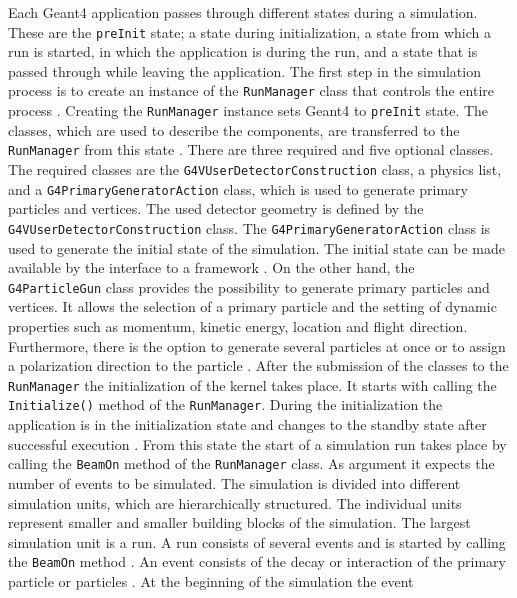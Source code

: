 \documentclass[12pt, a4paper]{thesis}
\begin{document}
Each Geant4 application passes through different states during a
simulation. These are the \texttt{preInit} state; a state during
initialization, a state from which a run is started, in which the
application is during the run, and a state that is passed through
while leaving the application. The first step in the simulation
process is to create an instance of the \texttt{RunManager} class that
controls the entire process \cite{geant4-doc} . Creating the
\texttt{RunManager} instance sets Geant4 to \texttt{preInit}
state. The classes, which are used to describe the components, are
transferred to the \texttt{RunManager} from this state
\cite{geant4-doc} . There are three required and five optional
classes. The required classes are the
\texttt{G4VUserDetectorConstruction} class, a physics list, and a
\texttt{G4PrimaryGeneratorAction} class, which is used to generate
primary particles and vertices. The used detector geometry is defined
by the \texttt{G4VUserDetectorConstruction} class. The
\texttt{G4PrimaryGeneratorAction} class is used to generate the
initial state of the simulation. The initial state can be made
available by the interface to a framework \cite{geant_simul_toolk}
. On the other hand, the \texttt{G4ParticleGun} class provides the
possibility to generate primary particles and vertices. It allows the
selection of a primary particle and the setting of dynamic properties
such as momentum, kinetic energy, location and flight
direction. Furthermore, there is the option to generate several
particles at once or to assign a polarization direction to the
particle \cite{geant4-doc}. After the submission of the classes to the
\texttt{RunManager} the initialization of the kernel takes place. It
starts with calling the \texttt{Initialize()} method of the
\texttt{RunManager}. During the initialization the application is in
the initialization state and changes to the standby state after
successful execution \cite{geant4-doc}. From this state the start of a
simulation run takes place by calling the \texttt{BeamOn} method of
the \texttt{RunManager} class. As argument it expects the number of
events to be simulated.  The simulation is divided into different
simulation units, which are hierarchically structured. The individual
units represent smaller and smaller building blocks of the simulation.
The largest simulation unit is a run. A run consists of several events
and is started by calling the \texttt{BeamOn} method
\cite{geant4-doc,geant4-rec-dev}. An event consists of the decay or
interaction of the primary particle or particles
\cite{geant4-rec-dev}. At the beginning of the simulation the event
\end{document}
